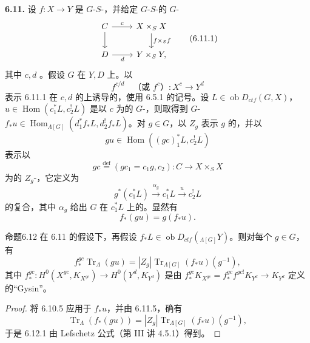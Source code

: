 \textbf{6.11.} 设 $f:X\to Y$ 是 $G$-$S$-，并给定 $G$-$S$-的 $G$-
\begin{equation}\begin{tikzcd}C\arrow[r,"c"]\arrow[d]&X\times_SX\arrow[d,"f\times_Sf"]\\D\arrow[r,"d"']&Y\times_SY,\end{tikzcd}\tag{6.11.1}\end{equation}
其中 $c,d$ 。假设 $G$ 在 $Y,D$ 上。以
\begin{equation}f^{c/d}\quad\text{（或 }f^c\text{）}:X^c\longrightarrow Y^d\tag{6.11.2}\end{equation}
表示 6.11.1 在 $c,d$ 的上诱导的，使用 6.5.1 的记号。设 $L\in\operatorname{ob}D_{ctf}(G,X)$，$u\in\operatorname{Hom}(c_1^*L,c_2^!L)$ 是以 $c$ 为的 $G$-，则取得到 $G$- $f_*u\in\operatorname{Hom}_{\Lambda[G]}(d_1^*f_*L,d_2^!f_*L)$。对 $g\in G$，以 $Z_g$ 表示 $g$ 的，并以
\begin{equation}gu\in\operatorname{Hom}((gc)_1^*L,c_2^!L)\tag{6.11.3}\end{equation}
表示以
\begin{equation}gc\overset{\mathrm{def}}=(gc_1=c_1g,c_2):C\longrightarrow X\times_SX\tag{6.11.4}\end{equation}
为的 $Z_g$-，它定义为
\[g^*(c_1^*L)\xrightarrow{\alpha_g}c_1^*L\xrightarrow{u}c_2^!L\]
的复合，其中 $\alpha_g$ 给出 $G$ 在 $c_1^*L$ 上的。显然有
\begin{equation}f_*(gu)=g(f_*u).\tag{6.11.5}\end{equation}
\begin{SGAresult}{命题}{6.12}
在 6.11 的假设下，再假设 $f_*L\in\operatorname{ob}D_{ctf}({}_{\Lambda[G]}Y)$。则对每个 $g\in G$，有
\begin{equation}f_*^{gc}\operatorname{Tr}_\Lambda(gu)=|Z_g|\operatorname{Tr}_{\Lambda[G]}(f_*u)(g^{-1}),\tag{6.12.1}\end{equation}
其中 $f_*^{gc}:H^0(X^{gc},K_{X^{gc}})\to H^0(Y^d,K_{Y^d})$ 是由 $f_*^{gc}K_{X^{gc}}=f_*^{gc}f^{gc!}K_{Y^d}\to K_{Y^d}$ 定义的“Gysin”。
\end{SGAresult}
\begin{proof}将 6.10.5 应用于 $f_*u$，并由 6.11.5，确有
\[\operatorname{Tr}_\Lambda(f_*(gu))=|Z_g|\operatorname{Tr}_{\Lambda[G]}(f_*u)(g^{-1}),\]
于是 6.12.1 由 Lefschetz 公式（第 III 讲 4.5.1）得到。\end{proof}

